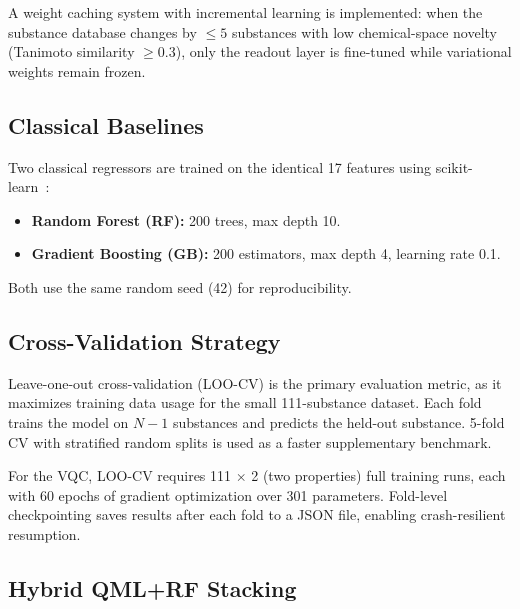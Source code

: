 \documentclass[12pt,a4paper]{article}
\newcommand{\loocv}{LOO-CV}
\newcommand{\nparams}{301}
\newcommand{\nsub}{111}
\newcommand{\nfeat}{17}
\begin{document}
A weight caching system with incremental learning is implemented: when
the substance database changes by $\leq 5$ substances with low
chemical-space novelty (Tanimoto similarity $\geq 0.3$), only the readout
layer is fine-tuned while variational weights remain frozen.


\subsection{Classical Baselines}
\label{sec:baselines}

Two classical regressors are trained on the identical \nfeat{} features
using scikit-learn~\citep{sklearn2011}:

\begin{itemize}[nosep]
  \item \textbf{Random Forest (RF):} 200 trees, max depth 10.
  \item \textbf{Gradient Boosting (GB):} 200 estimators, max depth 4,
        learning rate 0.1.
\end{itemize}

Both use the same random seed (42) for reproducibility.


\subsection{Cross-Validation Strategy}
\label{sec:cv}

Leave-one-out cross-validation (\loocv{}) is the primary evaluation metric,
as it maximizes training data usage for the small \nsub{}-substance dataset.
Each fold trains the model on $N-1$ substances and predicts the held-out
substance. 5-fold CV with stratified random splits is used as a faster
supplementary benchmark.

For the VQC, \loocv{} requires \nsub{} $\times$ 2 (two properties) full
training runs, each with 60 epochs of gradient optimization over \nparams{}
parameters. Fold-level checkpointing saves results after each fold to a
JSON file, enabling crash-resilient resumption.


\subsection{Hybrid QML+RF Stacking}
\label{sec:hybrid}
\end{document}
